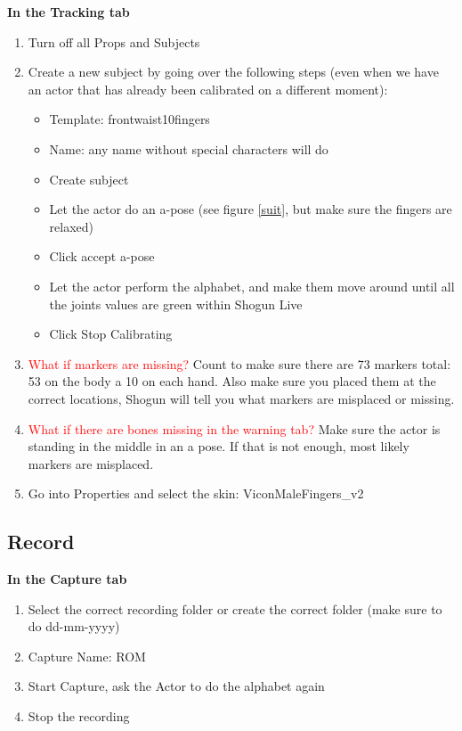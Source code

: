 \textbf{In the Tracking tab}
\begin{enumerate}
    \item Turn off all Props and Subjects
    \item Create a new subject by going over the following steps (even when we have an actor that has already been calibrated on a different moment):
    \begin{itemize}
        \item Template: frontwaist10fingers
        \item Name: any name without special characters will do
        \item Create subject
        \item Let the actor do an a-pose (see figure \ref{suit}, but make sure the fingers are relaxed)
        \item Click accept a-pose
        \item Let the actor perform the alphabet, and make them move around until all the joints values are green within Shogun Live
        \item Click Stop Calibrating
    \end{itemize}
    \item \textcolor{red}{What if markers are missing?} Count to make sure there are 73 markers total: 53 on the body a 10 on each hand. Also make sure you placed them at the correct locations, Shogun will tell you what markers are misplaced or missing.
    \item \textcolor{red}{What if there are bones missing in the warning tab?} Make sure the actor is standing in the middle in an a pose. If that is not enough, most likely markers are misplaced.
    \item Go into Properties and select the skin: ViconMaleFingers\_v2
\end{enumerate}

\subsection{Record}
\textbf{In the Capture tab}
\begin{enumerate}
    \item Select the correct recording folder or create the correct folder (make sure to do dd-mm-yyyy)
    \item Capture Name: ROM
    \item Start Capture, ask the Actor to do the alphabet again
    \item Stop the recording
\end{enumerate}

